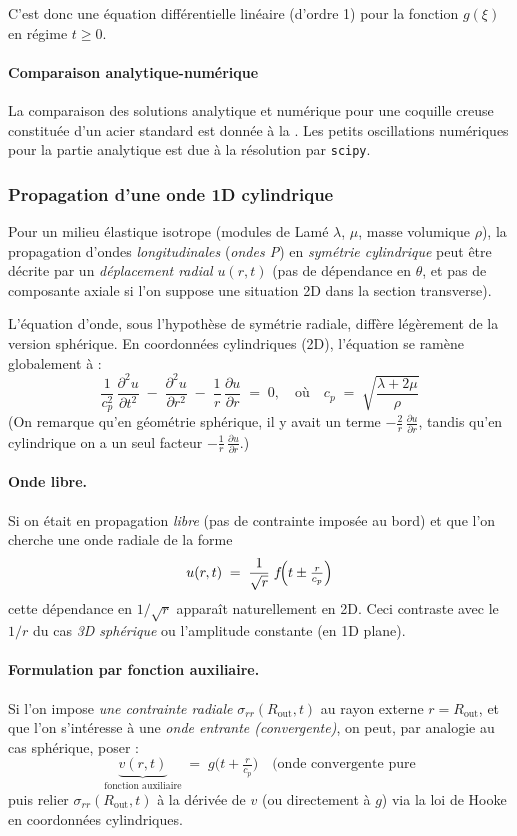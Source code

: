 \documentclass[10pt]{book}
\begin{document}
C’est donc une équation différentielle linéaire (d’ordre 1) pour la fonction $g(\xi)$ en régime $t\ge 0$.
\paragraph{Comparaison analytique-numérique}
La comparaison des solutions analytique et numérique pour une coquille creuse constituée d'un acier standard est donnée à la . Les petits oscillations numériques pour la partie analytique est due à la résolution par  \texttt{scipy}.
\subsubsection{Propagation d'une onde 1D cylindrique}
Pour un milieu élastique isotrope (modules de Lamé $\lambda$, $\mu$, masse volumique $\rho$), la propagation d’ondes \emph{longitudinales} (\textit{ondes P}) en \emph{symétrie cylindrique} peut être décrite par un \emph{déplacement radial} $u(r,t)$ (pas de dépendance en $\theta$, et pas de composante axiale si l’on suppose une situation 2D dans la section transverse).  

L’équation d’onde, sous l’hypothèse de symétrie radiale, diffère légèrement de la version sphérique. En coordonnées cylindriques (2D), l’équation se ramène globalement à :
$$\frac{1}{c_p^2}\,\frac{\partial^2 u}{\partial t^2} \;-\;\frac{\partial^2 u}{\partial r^2} \;-\;\frac{1}{r}\,\frac{\partial u}{\partial r} \;=\;0, \quad \text{où} \quad c_p \;=\;\sqrt{\frac{\lambda + 2\mu}{\rho}}$$
(On remarque qu’en géométrie sphérique, il y avait un terme $-\tfrac{2}{r}\,\tfrac{\partial u}{\partial r}$, tandis qu’en cylindrique on a un seul facteur $-\tfrac{1}{r}\,\tfrac{\partial u}{\partial r}$.)

\paragraph{Onde libre.} 
Si on était en propagation \emph{libre} (pas de contrainte imposée au bord) et que l’on cherche une onde radiale de la forme 
$$u(r,t) \;=\;\frac{1}{\sqrt{r}}\;f\!\Bigl(t \pm \tfrac{r}{c_p}\Bigr)$$
cette dépendance en $1/\sqrt{r}$ apparaît naturellement en 2D. Ceci contraste avec le $1/r$ du cas \emph{3D sphérique} ou l’amplitude constante (en 1D plane).  
\paragraph{Formulation par fonction auxiliaire.} 
Si l’on impose \emph{une contrainte radiale} $\sigma_{rr}(R_{\text{out}},t)$ au rayon externe $r=R_{\text{out}}$, et que l’on s’intéresse à une \emph{onde entrante (convergente)}, on peut, par analogie au cas sphérique, poser :  
$$\underbrace{v(r,t)}_{\text{fonction auxiliaire}}
\;=\;
g\!\bigl(t + \tfrac{r}{c_p}\bigr)
\quad(\text{onde convergente pure}$$
puis relier $\sigma_{rr}(R_{\text{out}},t)$ à la dérivée de $v$ (ou directement à $g$) via la loi de Hooke en coordonnées cylindriques.  
\end{document}

